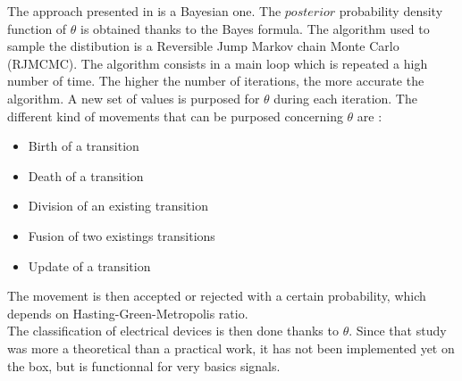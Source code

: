 The approach presented in \cite{research2} is a Bayesian one. The $posterior$ probability density function of $\theta$ is obtained thanks to the Bayes formula. The algorithm used to sample the distibution is a Reversible Jump Markov chain Monte Carlo (RJMCMC). The algorithm consists in a main loop which is repeated a high number of time. The higher the number of iterations, the more accurate the algorithm. A new set of values is purposed for $\theta$ during each iteration. The different kind of movements that can be purposed concerning $\theta$ are :
\begin{itemize}
\item Birth of a transition
\item Death of a transition
\item Division of an existing transition
\item Fusion of two existings transitions
\item Update of a transition
\end{itemize}
The movement is then accepted or rejected with a certain probability, which depends on Hasting-Green-Metropolis ratio.
\\

The classification of electrical devices is then done thanks to $\theta$. Since that study was more a theoretical than a practical work, it has not been implemented yet on the box, but is functionnal for very basics signals.
